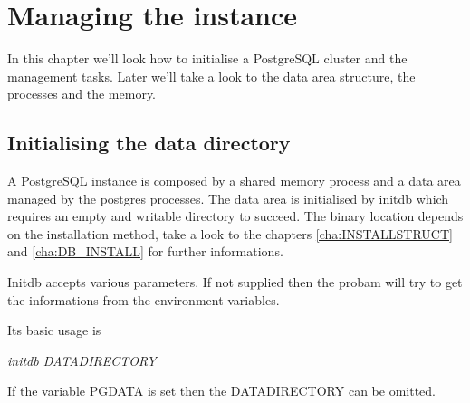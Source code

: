 \chapter{Managing the instance}
In this chapter we'll look how to initialise a PostgreSQL cluster and the 
management tasks.
Later we'll take a look to the data area structure, the processes and the memory.

\section{Initialising the data directory}
A PostgreSQL instance is composed by a shared memory process and a data area 
managed by the postgres processes.
The data area is initialised by initdb which requires an empty 
and writable directory to succeed. The binary location depends on the 
installation method, take a look to the chapters \ref{cha:INSTALLSTRUCT} and 
\ref{cha:DB_INSTALL} for further informations.

Initdb accepts various parameters. If not supplied then the probam will try to 
get the informations from the environment variables.\newline

Its basic usage is 

\textit{initdb DATADIRECTORY}

If the variable PGDATA is set then the DATADIRECTORY can be omitted.

